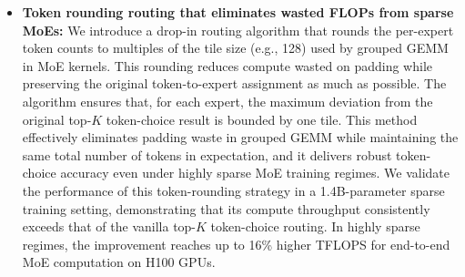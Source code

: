 \begin{itemize}
    
    \item \textbf{Token rounding routing that eliminates wasted FLOPs from sparse MoEs:}
    We introduce a drop-in routing algorithm that rounds the per-expert token counts to multiples of the tile size (e.g., 128) used by grouped GEMM in MoE kernels. This rounding reduces compute wasted on padding while preserving the original token-to-expert assignment as much as possible. The algorithm ensures that, for each expert, the maximum deviation from the original top-$K$ token-choice result is bounded by one tile. This method effectively eliminates padding waste in grouped GEMM while maintaining the same total number of tokens in expectation, and it delivers robust token-choice accuracy even under highly sparse MoE training regimes. We validate the performance of this token-rounding strategy in a 1.4B-parameter sparse training setting, demonstrating that its compute throughput consistently exceeds that of the vanilla top-$K$ token-choice routing. In highly sparse regimes, the improvement reaches up to 16\% higher TFLOPS for end-to-end MoE computation on H100 GPUs.


\end{itemize}
